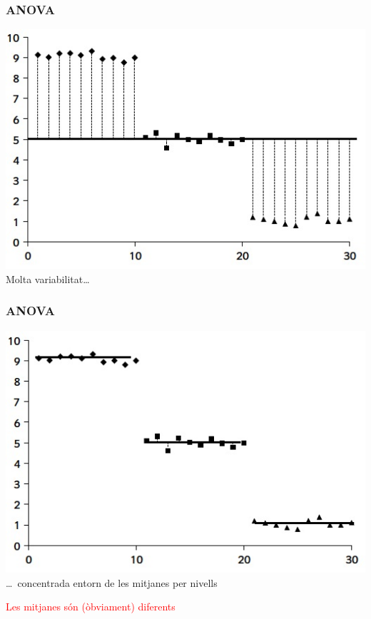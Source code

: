 \documentclass[12pt,t]{beamer}
\newcommand{\red}[1]{\textcolor{red}{#1}}
\theoremstyle{plain}
\theoremstyle{definition}
\begin{document}
\begin{frame}
\frametitle{ANOVA}

\begin{center}
\includegraphics[width=0.8\linewidth]{FD1-1}\\
Molta variabilitat\ldots 
\end{center}
\end{frame}

\begin{frame}
\frametitle{ANOVA}

\begin{center}
\includegraphics[width=0.8\linewidth]{FD1-2}\\
\ldots\ concentrada entorn de les mitjanes per nivells \\ \pause
\medskip

\red{Les mitjanes són (òbviament) diferents}

\end{center}
\end{frame}
\end{document}
